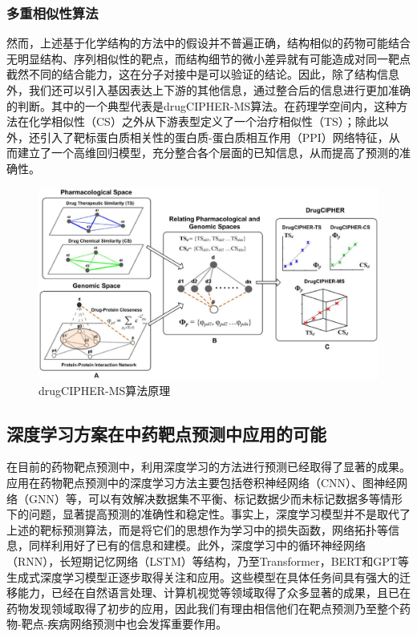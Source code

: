 \subsubsection{多重相似性算法}

然而，上述基于化学结构的方法中的假设并不普遍正确，结构相似的药物可能结合无明显结构、序列相似性的靶点，而结构细节的微小差异就有可能造成对同一靶点截然不同的结合能力，这在分子对接中是可以验证的结论。因此，除了结构信息外，我们还可以引入基因表达上下游的其他信息，通过整合后的信息进行更加准确的判断。其中的一个典型代表是drugCIPHER-MS算法。在药理学空间内，这种方法在化学相似性（CS）之外从下游表型定义了一个治疗相似性（TS）；除此以外，还引入了靶标蛋白质相关性的蛋白质-蛋白质相互作用（PPI）网络特征，从而建立了一个高维回归模型，充分整合各个层面的已知信息，从而提高了预测的准确性\cite{Zhao_Li_2010}。

\begin{figure}[H]
  \centering
  \includegraphics[width=\linewidth]{figures/drugCIPHER-MS.png}
  \caption{drugCIPHER-MS算法原理\cite{Zhao_Li_2010}}
  \label{fig:drugCIPHER-MS}
\end{figure}

\subsection{深度学习方案在中药靶点预测中应用的可能}

在目前的药物靶点预测中，利用深度学习的方法进行预测已经取得了显著的成果。应用在药物靶点预测中的深度学习方法主要包括卷积神经网络（CNN）、图神经网络（GNN）等\cite{Tsubaki_Tomii_Sese_2019}，可以有效解决数据集不平衡、标记数据少而未标记数据多等情形下的问题，显著提高预测的准确性和稳定性。事实上，深度学习模型并不是取代了上述的靶标预测算法，而是将它们的思想作为学习中的损失函数，网络拓扑等信息，同样利用好了已有的信息和建模。此外，深度学习中的循环神经网络（RNN），长短期记忆网络（LSTM）等结构，乃至Transformer，BERT和GPT等生成式深度学习模型正逐步取得关注和应用。这些模型在具体任务间具有强大的迁移能力，已经在自然语言处理、计算机视觉等领域取得了众多显著的成果，且已在药物发现领域取得了初步的应用，因此我们有理由相信他们在靶点预测乃至整个药物-靶点-疾病网络预测中也会发挥重要作用\cite{Haroon_C.a._A.s._2023}。

